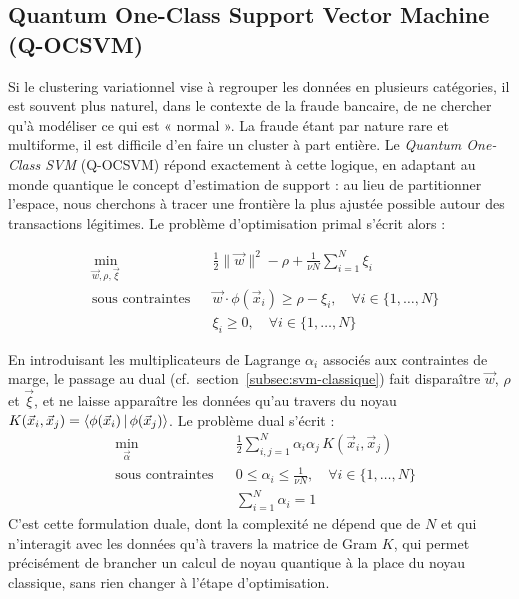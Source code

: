 \documentclass[a4paper]{article}
\begin{document}
\subsection{Quantum One-Class Support Vector Machine (Q-OCSVM)}
\label{subsec:q-ocsvm}

Si le clustering variationnel vise à regrouper les données en plusieurs catégories, il est souvent plus naturel, dans le contexte de la fraude bancaire, de ne chercher qu'à modéliser ce qui est « normal ». La fraude étant par nature rare et multiforme, il est difficile d'en faire un cluster à part entière. Le \emph{Quantum One-Class SVM} (Q-OCSVM) répond exactement à cette logique, en adaptant au monde quantique le concept d'estimation de support \cite{scholkopf2001ocsvm} : au lieu de partitionner l'espace, nous cherchons à tracer une frontière la plus ajustée possible autour des transactions légitimes. Le problème d'optimisation primal s'écrit alors :

\begin{equation}
\begin{aligned}
    & \min_{\vec{w}, \rho, \vec{\xi}}
    & & \frac{1}{2} \|\vec{w}\|^2 - \rho + \frac{1}{\nu N} \sum_{i=1}^{N} \xi_i \\
    & \text{sous contraintes}
    & & \vec{w} \cdot \phi(\vec{x}_i) \geq \rho - \xi_i, \quad \forall i \in \{1, \dots, N\} \\
    & & & \xi_i \geq 0, \quad \forall i \in \{1, \dots, N\}
\end{aligned}
\label{eq:ocsvm_primal}
\end{equation}

En introduisant les multiplicateurs de Lagrange $\alpha_i$ associés aux contraintes de marge, le passage au dual (cf.~section~\ref{subsec:svm-classique}) fait disparaître $\vec{w}$, $\rho$ et $\vec{\xi}$, et ne laisse apparaître les données qu'au travers du noyau $K(\vec{x}_i, \vec{x}_j) = \braket{\phi(\vec{x}_i)\,|\,\phi(\vec{x}_j)}$. Le problème dual s'écrit :
\begin{equation}
\begin{aligned}
    & \min_{\vec{\alpha}}
    & & \frac{1}{2} \sum_{i,j=1}^{N} \alpha_i \alpha_j\, K(\vec{x}_i, \vec{x}_j) \\
    & \text{sous contraintes}
    & & 0 \leq \alpha_i \leq \frac{1}{\nu N}, \quad \forall i \in \{1, \dots, N\} \\
    & & & \sum_{i=1}^{N} \alpha_i = 1
\end{aligned}
\label{eq:ocsvm_dual}
\end{equation}
C'est cette formulation duale, dont la complexité ne dépend que de $N$ et qui n'interagit avec les données qu'à travers la matrice de Gram $K$, qui permet précisément de brancher un calcul de noyau quantique à la place du noyau classique, sans rien changer à l'étape d'optimisation.
\end{document}
